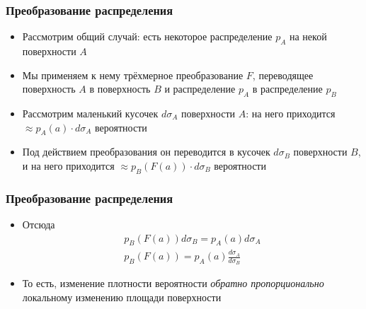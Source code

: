 \documentclass[handout,10pt]{beamer}
\begin{document}
\begin{frame}
\frametitle{Преобразование распределения}
\begin{itemize}
\item Рассмотрим общий случай: есть некоторое распределение \begin{math}p_A\end{math} на некой поверхности \begin{math}A\end{math}
\pause
\item Мы применяем к нему трёхмерное преобразование \begin{math}F\end{math}, переводящее поверхность \begin{math}A\end{math} в поверхность \begin{math}B\end{math} и распределение \begin{math}p_A\end{math} в распределение \begin{math}p_B\end{math}
\pause
\item Рассмотрим маленький кусочек \begin{math}d\sigma_A\end{math} поверхности \begin{math}A\end{math}: на него приходится \begin{math}\approx p_A(a) \cdot d\sigma_A\end{math} вероятности
\pause
\item Под действием преобразования он переводится в кусочек \begin{math}d\sigma_B\end{math} поверхности \begin{math}B\end{math}, и на него приходится \begin{math}\approx p_B(F(a)) \cdot d\sigma_B\end{math} вероятности
\end{itemize}
\end{frame}

\begin{frame}
\frametitle{Преобразование распределения}
\begin{itemize}
\item Отсюда
\begin{gather*}
p_B(F(a)) d\sigma_B = p_A(a) d\sigma_A \\
p_B(F(a)) = p_A(a) \frac{d\sigma_A}{d\sigma_B}
\end{gather*}
\pause
\item То есть, изменение плотности вероятности \textit{обратно пропорционально} локальному изменению площади поверхности
\end{itemize}
\end{frame}
\end{document}
